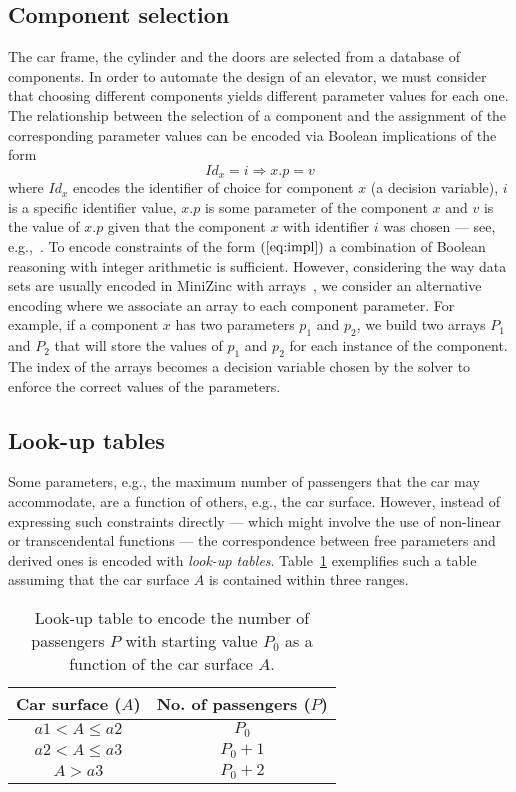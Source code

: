 \subsection{Component selection}
The car frame, the cylinder and the doors are selected from a database 
of components. In order to automate the design of an elevator, we must 
consider that choosing different components yields different 
parameter values for each one. The relationship between the selection of 
a component and the assignment of the corresponding parameter 
values can be encoded via Boolean implications of the form
\begin{equation}
	\label{eq:impl}
	Id_x = i \Rightarrow x.p = v
\end{equation}
where $Id_x$ encodes the identifier of choice for component $x$ (a
decision variable), $i$ is a specific identifier value, $x.p$ is some 
parameter of the component $x$ and $v$ is the value of $x.p$ given
that the component $x$ with identifier $i$ was chosen --- see, 
e.g.,~\cite{bacchus2007gac}.
To encode constraints of the form $(\ref{eq:impl})$ a combination
of Boolean reasoning with integer arithmetic is sufficient.
However, considering the way data sets are usually encoded in MiniZinc 
with arrays~\cite{marriott2014minizinc}, we consider an alternative
encoding where we associate an array to each component parameter.
For example, if a component $x$ has two parameters $p_1$ and $p_2$,
we build two arrays $P_1$ and $P_2$ that will store the values of
$p_1$ and $p_2$ for each instance of the component. The index of the
arrays becomes a decision variable chosen by the solver
to enforce the correct values of the parameters.  

\subsection{Look-up tables}
Some parameters, e.g., the maximum number of passengers that the car
may accommodate, are a function of others, e.g., the car
surface. However, instead of expressing such constraints directly --- 
which might involve the use of non-linear or transcendental functions 
--- the correspondence between free parameters and derived ones is 
encoded with \emph{look-up tables}. Table~\ref{tab:passengers} 
exemplifies such a table assuming that the car surface $A$ is contained 
within three ranges.

\begin{table}[t]
	\setlength{\tabcolsep}{20pt}
	\caption{\label{tab:passengers} Look-up table to encode the
		number of passengers $P$ with starting value $P_0$ as a 
		function of the car surface $A$.}
	\centering
	\begin{tabular}{c c}
		\toprule
		\textbf{Car surface ($A$)} & \textbf{No. of passengers ($P$)} \\ 
		\midrule 
		$a1 < A \le a2$ & $P_{0}$ \\ 
		$a2 < A \le a3$ & $P_{0} + 1$ \\ 
		$A > a3$ & $P_{0} + 2$ \\
		\bottomrule
	\end{tabular}
\end{table}

